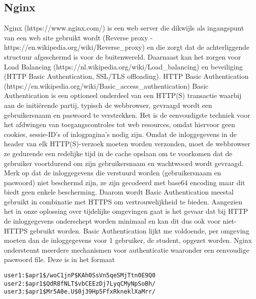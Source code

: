 \subsection{Nginx}

Nginx (https://www.nginx.com/) is een web server die dikwijls als ingangspunt van een web site gebruikt wordt (Reverse proxy - https://en.wikipedia.org/wiki/Reverse\_proxy) en die zorgt dat de achterliggende structuur afgeschermd is voor de buitenwereld. Daarnaast kan het zorgen voor Load Balancing (https://nl.wikipedia.org/wiki/Load\_balancing) en beveiliging (HTTP Basic Authentication, SSL/TLS offloading).
\newline
\newline
HTTP Basic Authentication (https://en.wikipedia.org/wiki/Basic\_access\_authentication)
Basic Authentication is een optioneel onderdeel van een HTTP(S) transactie waarbij aan de initiërende partij, typisch de webbrowser, gevraagd wordt een gebruikersnaam en paswoord te verstrekken. Het is de eenvoudigste techniek voor het afdwingen van toegangscontroles tot web resources, omdat hiervoor geen cookies, sessie-ID's of inlogpagina's nodig zijn.
Omdat de inloggegevens in de header van elk HTTP(S)-verzoek moeten worden verzonden, moet de webbrowser ze gedurende een redelijke tijd in de cache opslaan om te voorkomen dat de gebruiker voortdurend om zijn gebruikersnaam en wachtwoord wordt gevraagd.
Merk op dat de inloggegevens die verstuurd worden (gebruikersnaam en paswoord) niet beschermd zijn, ze zijn gecodeerd met base64 encoding maar dit biedt geen enkele bescherming. Daarom wordt Basic Authentication meestal gebruikt in combinatie met HTTPS om vertrouwelijkheid te bieden. Aangezien het in onze oplossing over tijdelijke omgevingen gaat is het gevaar dat bij HTTP de inloggegevens onderschept worden minimaal en kan dit dus ook voor niet-HTTPS gebruikt worden.
\newline
\newline
Basic Authentication lijkt me voldoende, per omgeving moeten dan de inloggegevens voor 1 gebruiker, de student, opgezet worden. Nginx ondersteunt meerdere mechanismen voor authenticatie waaronder een eenvoudige paswoord file. Deze is in het formaat
\newline
\newline

\begin{lstlisting}
user1:$apr1$/woC1jnP$KAh0SsVn5qeSMjTtn0E9Q0
user2:$apr1$QdR8fNLT$vbCEEzDj7LyqCMyNpSoBh/
user3:$apr1$Mr5A0e.U$0j39Hp5FfxRkneklXaMrr/ 

\end{lstlisting}

